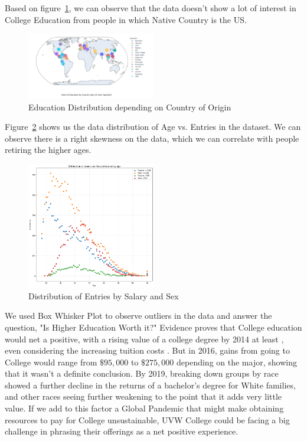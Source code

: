 \documentclass{IEEEtran}
\begin{document}
Based on figure~\ref{fig:EducationDistributionByCountryOfOrigin}, we can observe that the data doesn't show a lot of interest in College Education from people in which Native Country is the US.

\begin{figure}[!t]
  \centering
  \captionsetup{justification=centering}
  \includegraphics[width=0.5\textwidth]{EducationDistributionByCountryOfOrigin.png}%
  \caption{Education Distribution depending on Country of Origin}%
  \label{fig:EducationDistributionByCountryOfOrigin}%
\end{figure}

Figure~\ref{fig:DistributionOfIncomePerSexScatter} shows us the data distribution of Age vs. Entries in the dataset. We can observe there is a right skewness on the data, which we can correlate with people retiring the higher ages.

\begin{figure}[!t]
  \centering
  \captionsetup{justification=centering}
  \includegraphics[width=0.5\textwidth]{DistributionOfIncomePerSexScatter.png}%
  \caption{Distribution of Entries by Salary and Sex}%
  \label{fig:DistributionOfIncomePerSexScatter}%
\end{figure}

We used Box Whisker Plot to observe outliers in the data and answer the question, "Is Higher Education Worth it?" Evidence proves that College education would net a positive, with a rising value of a college degree by 2014 at least \cite{leonhardt2014college}, even considering the increasing tuition costs \cite{daly2014still}. But in 2016, gains from going to College would range from $\$95,000$ to $\$275,000$ depending on the major\cite{webber2016college}, showing that it wasn't a definite conclusion. By 2019, breaking down groups by race showed a further decline in the returns of a bachelor's degree for White families, and other races seeing further weakening to the point that it adds very little value\cite{emmons2019college}. If we add to this factor a Global Pandemic that might make obtaining resources to pay for College unsustainable, UVW College could be facing a big challenge in phrasing their offerings as a net positive experience.
\end{document}
